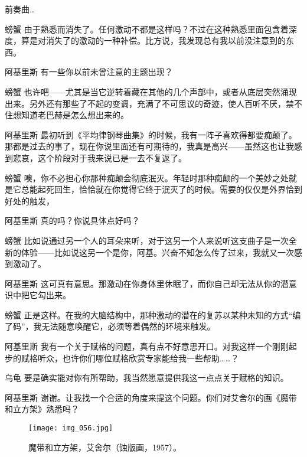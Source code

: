 \begin{dialog}{前奏曲…}
\begin{dialogue}
\item[螃蟹]由于熟悉而消失了。任何激动不都是这样吗？不过在这种熟悉里面包含着深度，算是对消失了的激动的一种补偿。比方说，我发现总有我以前没注意到的东西。

\item[阿基里斯]有一些你以前未曾注意的主题出现？

\item[螃蟹]也许吧——尤其是当它逆转着藏在其他的几个声部中，或者从底层突然涌现出来。另外还有那些了不起的变调，充满了不可思议的奇迹，使人百听不厌，禁不住想知道老巴赫是怎么想出来的。

\item[阿基里斯]最初听到《平均律钢琴曲集》的时候，我有一阵子喜欢得都要痴颠了。那都是过去的事了，现在你说里面还有可期待的，我真是高兴——虽然这也让我感到悲哀，这个阶段对于我来说已是一去不复返了。

\item[螃蟹]噢，你不必担心你那种痴颠会彻底泯灭。年轻时那种痴颠的一个美妙之处就是它总能起死回生，恰恰就在你觉得它终于泯灭了的时候。需要的仅仅是外界恰到好处的触发，

\item[阿基里斯]真的吗？你说具体点好吗？

\item[螃蟹]比如说通过另一个人的耳朵来听，对于这另一个人来说听这支曲子是一次全新的体验——比如说这另一个是你，阿基。兴奋不知怎么传了过来，我就又一次感到激动了。

\item[阿基里斯]这可真有意思。那激动在你身体里休眠了，而你自己却无法从你的潜意识中把它勾出来。

\item[螃蟹]正是这样。在我的大脑结构中，那种激动的潜在的复苏以某种未知的方式“编了码”，我无法随意唤醒它，必须等着偶然的环境来触发。

\item[阿基里斯]我有一个关于赋格的问题，真有点不好意思开口。对我这样一个刚刚起步的赋格听众，也许你们哪位赋格欣赏专家能给我一些帮助……？

\item[乌龟]要是确实能对你有所帮助，我当然愿意提供我这一点点关于赋格的知识。

\item[阿基里斯]谢谢。让我找一个合适的角度来提这个问题。你们对艾舍尔的画《魔带和立方架》熟悉吗？

\begin{figure}
\texttt{[image: img\_056.jpg]}
\caption[魔带和立方架，艾舍尔作。]
  {魔带和立方架，艾舍尔（蚀版画，1957）。}
\end{figure}


\end{dialogue}
\end{dialog}
